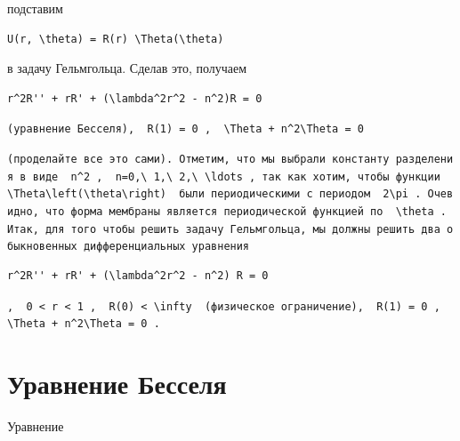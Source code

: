 \documentclass[
  ukrainian,
]{article}
\begin{document}
подставим

\begin{verbatim}
U(r, \theta) = R(r) \Theta(\theta)
\end{verbatim}

в задачу Гельмгольца. Сделав это, получаем

\begin{verbatim}
r^2R'' + rR' + (\lambda^2r^2 - n^2)R = 0
\end{verbatim}

\texttt{(уравнение\ Бесселя),\ \ \textquotesingle{}R(1)\ =\ 0\textquotesingle{}\ ,\ \ \textquotesingle{}\textbackslash{}Theta\textquotesingle{}\textquotesingle{}\ +\ n\^{}2\textbackslash{}Theta\ =\ 0\textquotesingle{}}

\texttt{(проделайте\ все\ это\ сами).\ Отметим,\ что\ мы\ выбрали\ константу\ разделения\ в\ виде\ \ \textquotesingle{}n\^{}2\textquotesingle{}\ ,\ \ \textquotesingle{}n=0,\textbackslash{}\ 1,\textbackslash{}\ 2,\textbackslash{}\ \textbackslash{}ldots\textquotesingle{}\ ,\ так\ как\ хотим,\ чтобы\ функции\ \ \textquotesingle{}\textbackslash{}Theta\textbackslash{}left(\textbackslash{}theta\textbackslash{}right)\textquotesingle{}\ \ были\ периодическими\ с\ периодом\ \ \textquotesingle{}2\textbackslash{}pi\textquotesingle{}\ .\ Очевидно,\ что\ форма\ мембраны\ является\ периодической\ функцией\ по\ \ \textquotesingle{}\textbackslash{}theta\textquotesingle{}\ .\ Итак,\ для\ того\ чтобы\ решить\ задачу\ Гельмгольца,\ мы\ должны\ решить\ два\ обыкновенных\ дифференциальных\ уравнения}

\begin{verbatim}
r^2R'' + rR' + (\lambda^2r^2 - n^2) R = 0
\end{verbatim}

\texttt{,\ \ \textquotesingle{}0\ \textless{}\ r\ \textless{}\ 1\textquotesingle{}\ ,\ \ \textquotesingle{}R(0)\ \textless{}\ \textbackslash{}infty\textquotesingle{}\ \ (физическое\ ограничение),\ \ \textquotesingle{}R(1)\ =\ 0\textquotesingle{}\ ,\ \ \textquotesingle{}\textbackslash{}Theta\textquotesingle{}\textquotesingle{}\ +\ n\^{}2\textbackslash{}Theta\ =\ 0\textquotesingle{}\ .}

\section{Уравнение
Бесселя}\label{ux443ux440ux430ux432ux43dux435ux43dux438ux435-ux431ux435ux441ux441ux435ux43bux44f}

Уравнение
\end{document}
